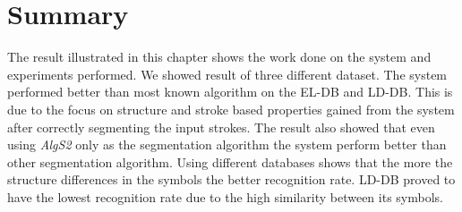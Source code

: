 %
%


\section{Summary}
\label{sec:ResultSummary}

The result illustrated in this chapter shows the work done on the system and experiments performed. We showed result of three different dataset. The system performed better than most known algorithm on the EL-DB and LD-DB. This is due to the focus on structure and stroke based properties gained from the system after correctly segmenting the input strokes. The result also showed that even using \textsl{AlgS2} only as the segmentation algorithm the system perform better than other segmentation algorithm. Using different databases shows that the more the structure differences in the symbols the better recognition rate. LD-DB proved to have the lowest recognition rate due to the high similarity between its symbols.    %


